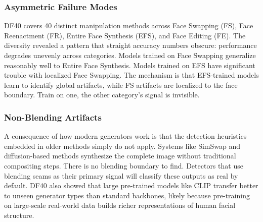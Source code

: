 \begin{table}[ht]
    \centering
    \caption{Comparative Analysis of Major Deepfake Datasets}
    \label{tab:dataset_comparison}
\end{table}

\subsubsection{Asymmetric Failure Modes}
DF40 covers 40 distinct manipulation methods across Face Swapping (FS), Face Reenactment (FR), Entire Face Synthesis (EFS), and Face Editing (FE). The diversity revealed a pattern that straight accuracy numbers obscure: performance degrades unevenly across categories. Models trained on Face Swapping generalize reasonably well to Entire Face Synthesis. Models trained on EFS have significant trouble with localized Face Swapping. The mechanism is that EFS-trained models learn to identify global artifacts, while FS artifacts are localized to the face boundary. Train on one, the other category's signal is invisible.

\subsubsection{Non-Blending Artifacts}
A consequence of how modern generators work is that the detection heuristics embedded in older methods simply do not apply. Systems like SimSwap and diffusion-based methods synthesize the complete image without traditional compositing steps. There is no blending boundary to find. Detectors that use blending seams as their primary signal will classify these outputs as real by default. DF40 also showed that large pre-trained models like CLIP transfer better to unseen generator types than standard backbones, likely because pre-training on large-scale real-world data builds richer representations of human facial structure.

